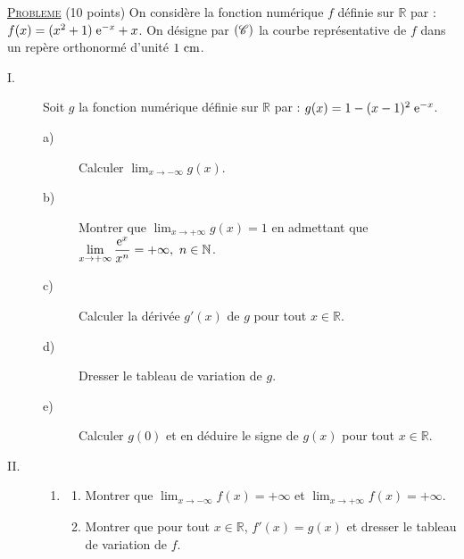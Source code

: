 \noindent \underline{\textsc{Probleme}} (10 points) \newline
      On considère la fonction numérique $f$ définie sur  $\mathbb{R}$ par : $f(x) =  (x^2 + 1)\; \mathrm{e}^{-x} + x$.
      On désigne par $(\mathscr{C})$ la courbe représentative de $f$ dans un repère orthonormé \Oij{} d'unit\'e $1~\mathrm{cm}$.
      \begin{description}
            \item[I. ]
                  Soit $g$ la fonction num\'erique d\'efinie sur $\mathbb{R}$ par : $g(x) = 1 - (x-1)^2\; \mathrm{e}^{-x}$.
                  \begin{description}
                        \item[a)] Calculer $\displaystyle{\lim_{x\rightarrow -\infty} g(x)}$.
                        \item[b)] Montrer que $\displaystyle{\lim_{x\rightarrow +\infty} g(x) = 1}$
                              en admettant que 
                              $\displaystyle{\lim_{x\rightarrow +\infty} \frac{\mathrm{e}^{x}}{x^n} = +\infty},\ n\in\mathbb{N}$.
                        \item[c)] Calculer la d\'eriv\'ee $g'(x)$ de $g$ pour tout $x\in\mathbb{R}$.
                        \item[d)] Dresser le tableau de variation de $g$.
                        \item[e)] Calculer $g(0)$ et en d\'eduire le signe de $g(x)$ pour tout $x \in \mathbb{R}$.
                  \end{description}
            \item[II. ]
                   \begin{enumerate}
                        \item \begin{enumerate}
                                    \item Montrer que $\displaystyle{\lim_{x\rightarrow -\infty} f(x) = +\infty}$
                                          et $\displaystyle{\lim_{x\rightarrow +\infty} f(x) = +\infty}$.
                                    \item Montrer que pour tout $x\in\mathbb{R}$, $f'(x) = g(x)$ et dresser le tableau de 
                                          variation de $f$.

\end{enumerate}
\end{enumerate}
\end{description}
